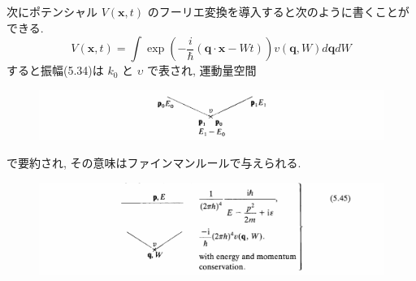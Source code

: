 \documentclass{jsarticle}
\begin{document}
次にポテンシャル $V(\mathbf{x}, t)$ のフーリエ変換を導入すると次のように書くことができる.
\begin{equation*}
    V(\mathbf{x}, t) = \int \exp \left( - \frac{i}{\hbar} (\mathbf{q} \cdot \mathbf{x} - Wt) \right) v(\mathbf{q}, W) d\mathbf{q} dW \tag{5.44}
\end{equation*}
すると振幅(5.34)は $k_0$ と $\upsilon$ で表され, 運動量空間
\begin{figure}[H]
    \centering
    \includegraphics[width=\textwidth]{figure/figB5-45.png}
\end{figure}
で要約され, その意味はファインマンルールで与えられる.
\begin{figure}[H]
    \centering
    \includegraphics[width=\textwidth]{figure/eq5-45.png}
\end{figure}
\end{document}

